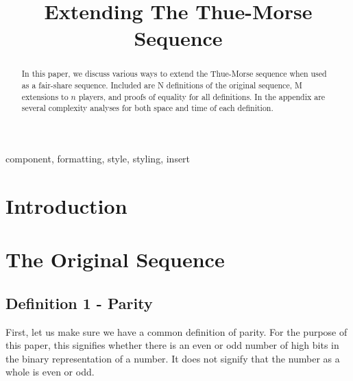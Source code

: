\documentclass[conference]{IEEEtran}
\begin{document}
\title{Extending The Thue-Morse Sequence}

\author{
\and
{}
}

\maketitle

\begin{abstract}
In this paper, we discuss various ways to extend the Thue-Morse sequence when used as a fair-share sequence. Included are N definitions of the original sequence, M extensions to $n$ players, and proofs of equality for all definitions. In the appendix are several complexity analyses for both space and time of each definition.
\end{abstract}

\begin{IEEEkeywords}
component, formatting, style, styling, insert
\end{IEEEkeywords}

\section{Introduction}

\section{The Original Sequence}

\subsection{Definition 1 - Parity}

First, let us make sure we have a common definition of parity. For the purpose of this paper, this signifies whether there is an even or odd number of high bits in the binary representation of a number. It does not signify that the number as a whole is even or odd.
\end{document}
